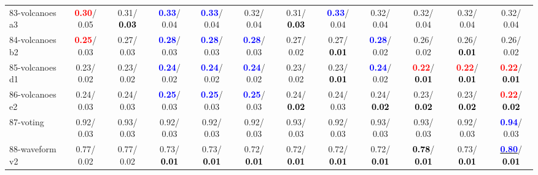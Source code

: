 \begin{table}[h]
\begin{center}
{\begin{tabular}{lc|c|c|c|c|c|c|c|c|c|c}
83-volcanoes a3 & \textcolor{red}{\textbf{  0.30}}/  0.05 &   0.31/\textcolor{black}{\textbf{  0.03}} & \textcolor{blue}{\textbf{  0.33}}/  0.04 & \textcolor{blue}{\textbf{  0.33}}/  0.04 &   0.32/  0.04 &   0.31/\textcolor{black}{\textbf{  0.03}} & \textcolor{blue}{\textbf{  0.33}}/  0.04 &   0.32/  0.04 &   0.32/  0.04 &   0.32/  0.04 &   0.32/  0.04 \\
84-volcanoes b2 & \textcolor{red}{\textbf{  0.25}}/  0.03 &   0.27/  0.03 & \textcolor{blue}{\textbf{  0.28}}/  0.03 & \textcolor{blue}{\textbf{  0.28}}/  0.03 & \textcolor{blue}{\textbf{  0.28}}/  0.03 &   0.27/  0.02 &   0.27/\textcolor{black}{\textbf{  0.01}} & \textcolor{blue}{\textbf{  0.28}}/  0.02 &   0.26/  0.02 &   0.26/\textcolor{black}{\textbf{  0.01}} &   0.26/  0.02 \\
85-volcanoes d1 &   0.23/  0.02 &   0.23/  0.02 & \textcolor{blue}{\textbf{  0.24}}/  0.02 & \textcolor{blue}{\textbf{  0.24}}/  0.02 & \textcolor{blue}{\textbf{  0.24}}/  0.02 &   0.23/  0.02 &   0.23/\textcolor{black}{\textbf{  0.01}} & \textcolor{blue}{\textbf{  0.24}}/  0.02 & \textcolor{red}{\textbf{  0.22}}/\textcolor{black}{\textbf{  0.01}} & \textcolor{red}{\textbf{  0.22}}/\textcolor{black}{\textbf{  0.01}} & \textcolor{red}{\textbf{  0.22}}/\textcolor{black}{\textbf{  0.01}} \\ \hline
86-volcanoes e2 &   0.24/  0.03 &   0.24/  0.03 & \textcolor{blue}{\textbf{  0.25}}/  0.03 & \textcolor{blue}{\textbf{  0.25}}/  0.03 & \textcolor{blue}{\textbf{  0.25}}/  0.03 &   0.24/\textcolor{black}{\textbf{  0.02}} &   0.24/  0.03 &   0.24/\textcolor{black}{\textbf{  0.02}} &   0.23/\textcolor{black}{\textbf{  0.02}} &   0.23/\textcolor{black}{\textbf{  0.02}} & \textcolor{red}{\textbf{  0.22}}/\textcolor{black}{\textbf{  0.02}} \\
87-voting &   0.92/  0.03 &   0.93/  0.03 &   0.92/  0.03 &   0.92/  0.03 &   0.92/  0.03 &   0.93/  0.03 &   0.92/  0.03 &   0.93/  0.03 &   0.93/  0.03 &   0.92/  0.03 & \textcolor{blue}{\textbf{  0.94}}/  0.03 \\
88-waveform v2 &   0.77/  0.02 &   0.77/  0.02 &   0.73/\textcolor{black}{\textbf{  0.01}} &   0.73/\textcolor{black}{\textbf{  0.01}} &   0.72/\textcolor{black}{\textbf{  0.01}} &   0.72/\textcolor{black}{\textbf{  0.01}} &   0.72/\textcolor{black}{\textbf{  0.01}} &   0.72/\textcolor{black}{\textbf{  0.01}} & \textcolor{black}{\textbf{  0.78}}/\textcolor{black}{\textbf{  0.01}} &   0.73/\textcolor{black}{\textbf{  0.01}} & \underline{\textcolor{blue}{\textbf{  0.80}}}/\textcolor{black}{\textbf{  0.01}} \\

\end{tabular}}
\end{center}
\end{table}
